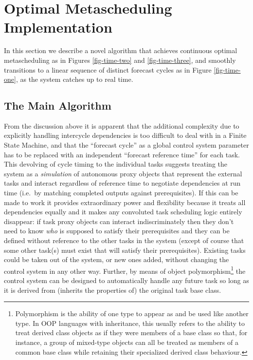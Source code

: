 \documentclass[11pt,a4paper]{article}
\begin{document}
\section{Optimal Metascheduling Implementation}

In this section we describe a novel algorithm that achieves continuous
optimal metascheduling as in Figures \ref{fig-time-two} and
\ref{fig-time-three}, and smoothly transitions to a linear sequence of
distinct forecast cycles as in Figure \ref{fig-time-one}, as the system
catches up to real time.  

\subsection{The Main Algorithm}

From the discussion above it is apparent that the additional complexity
due to explicitly handling intercycle dependencies is too difficult to
deal with in a Finite State Machine, and that the ``forecast cycle'' as
a global control system parameter has to be replaced with an independent
``forecast reference time'' for each task. This devolving of cycle
timing to the individual tasks suggests treating the system as a {\em
simulation} of autonomous proxy objects that represent the external
tasks and interact regardless of reference time to negotiate
dependencies at run time (i.e.\ by matching completed outputs against
prerequisites). If this can be made to work it provides extraordinary
power and flexibility because it treats all dependencies equally and it
makes any convoluted task scheduling logic entirely disappear: if task
proxy objects can interact indiscriminately then they don't need to know
{\em who} is supposed to satisfy their prerequisites and they can be
defined without reference to the other tasks in the system (except of
course that some other task(s) must exist that will satisfy their
prerequisites).  Existing tasks could be taken out of the system, or new
ones added, without changing the control system in any other way.
Further, by means of object polymorphism\footnote{Polymorphism is the
ability of one type to appear as and be used like another type. In OOP
languages with inheritance, this usually refers to the ability to treat
derived class objects as if they were members of a base class so that,
for instance, a group of mixed-type objects can all be treated as
members of a common base class while retaining their specialized derived
class behaviour.} the control system can be designed to automatically
handle any future task so long as it is derived from (inherits the
properties of) the original task base class.
\end{document}
